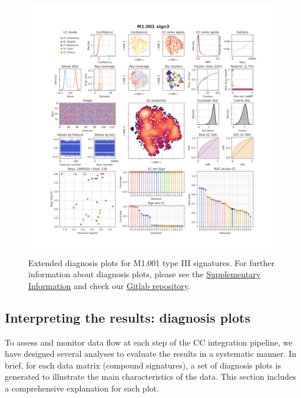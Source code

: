 \begin{figure}[htbp]
  \centering
  \includegraphics[width=1\linewidth]{figures/Protocols/Supplementary/M1.001_sign3_local_CC_M1_sign0_medium.png}
  \caption{
    Extended diagnosis plots for M1.001 type III signatures. For further information about diagnosis plots, please see the \hyperref[Supplementary_Protocols_Diagnosis]{Supplementary Information} and check our \href{https://gitlabsbnb.irbbarcelona.org/packages/protocols}{Gitlab repository}.
  }
  \label{Protocols_FigS11}
\end{figure}


\clearpage
{}
\subsection{Interpreting the results: diagnosis plots}
\label{Supplementary_Protocols_Diagnosis}

To assess and monitor data flow at each step of the CC integration pipeline, we have designed several analyses to evaluate the results in a systematic manner. In brief, for each data matrix (compound signatures), a set of diagnosis plots is generated to illustrate the main characteristics of the data. This section includes a comprehensive explanation for each plot.


